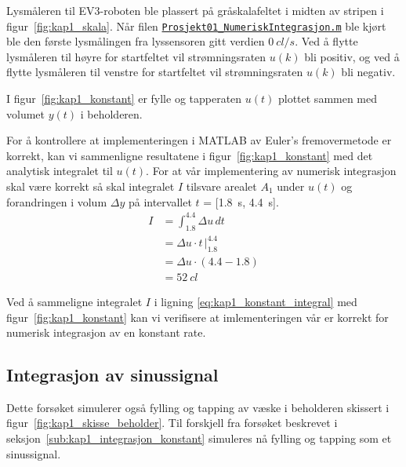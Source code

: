 \documentclass[main.tex]{subfiles}
\begin{document}


Lysmåleren til \textsc{EV3}-roboten ble plassert på gråskalafeltet i midten av stripen i figur~\ref{fig:kap1_skala}. Når filen \href{https://github.com/solbero/lego-project/blob/main/src/Prosjekt01_NumeriskIntegrasjon/Prosjekt01_NumeriskIntegrasjon.m}{\texttt{Prosjekt01\_NumeriskIntegrasjon.m}} ble kjørt ble den første lysmålingen fra lyssensoren gitt verdien $\SI{0}{cl/s}$. Ved å flytte lysmåleren til høyre for startfeltet vil strømningsraten $u(k)$ bli positiv, og ved å flytte lysmåleren til venstre for startfeltet vil strømningsraten $u(k)$ bli negativ.

I figur~\ref{fig:kap1_konstant} er fylle og tapperaten $u(t)$ plottet sammen med volumet $y(t)$ i beholderen.



For å kontrollere at implementeringen i \textsc{MATLAB} av Euler's fremovermetode er korrekt, kan vi sammenligne resultatene i figur~\ref{fig:kap1_konstant} med det analytisk integralet til $u(t)$. For at vår implementering av numerisk integrasjon skal være korrekt så skal integralet $I$ tilsvare arealet $A_1$ under $u(t)$ og forandringen i volum $\Delta y$ på intervallet $t$ = [\SI{1.8}{s}, \SI{4.4}{s}].
\begin{align}
    I & = \int_{1.8}^{4.4} \Delta u \, dt \nonumber       \\
      & = \Delta u \cdot t \, \Big|_{1.8}^{4.4} \nonumber \\
      & = \Delta u \cdot (4.4 - 1.8) \nonumber            \\
      & = \SI{52}{cl} \label{eq:kap1_konstant_integral}
\end{align}

Ved å sammeligne integralet $I$ i ligning \eqref{eq:kap1_konstant_integral} med figur~\ref{fig:kap1_konstant} kan vi verifisere at imlementeringen vår er korrekt for numerisk integrasjon av en konstant rate.

\subsection{Integrasjon av sinussignal}

Dette forsøket simulerer også fylling og tapping av væske i beholderen skissert i figur~\ref{fig:kap1_skisse_beholder}. Til forskjell fra forsøket beskrevet i seksjon~\ref{sub:kap1_integrasjon_konstant} simuleres nå fylling og tapping som et sinussignal.
\end{document}
